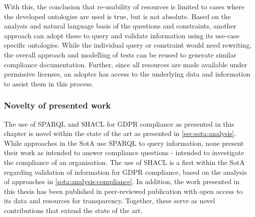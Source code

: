 With this, the conclusion that re-usability of resources is limited to cases where the developed ontologies are used is true, but is not absolute.
Based on the analysis and natural language basis of the questions and constraints, another approach can adopt these to query and validate information using its use-case specific ontologies.
While the individual query or constraint would need rewriting, the overall approach and modelling of tests can be reused to generate similar compliance documentation.
Further, since all resources are made available under permissive licenses, an adopter has access to the underlying data and information to assist them in this process.

\subsubsection{Novelty of presented work}
The use of SPARQL and SHACL for GDPR compliance as presented in this chapter is novel within the state of the art as presented in \autoref{sec:sota:analysis}.
While approaches in the SotA use SPARQL to query information, none present their work as intended to answer compliance questions - intended to investigate the compliance of an organisation.
The use of SHACL is a first within the SotA regarding validation of information for GDPR compliance, based on the analysis of approaches in \autoref{sota:analysis:compliance}.
In addition, the work presented in this thesis has been published in peer-reviewed publication with open access to its data and resources for transparency.
Together, these serve as novel contributions that extend the state of the art.